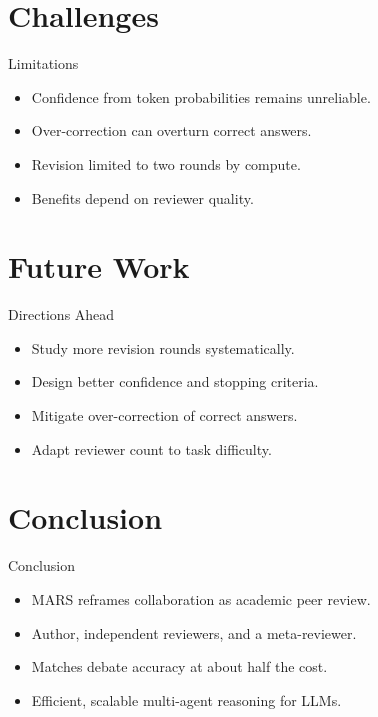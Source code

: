 \documentclass{beamer}
\begin{document}
\section{Challenges}
\begin{frame}{Limitations}
\begin{itemize}
\item Confidence from token probabilities remains unreliable.
\item Over-correction can overturn correct answers.
\item Revision limited to two rounds by compute.
\item Benefits depend on reviewer quality.
\end{itemize}
\end{frame}

\section{Future Work}
\begin{frame}{Directions Ahead}
\begin{itemize}
\item Study more revision rounds systematically.
\item Design better confidence and stopping criteria.
\item Mitigate over-correction of correct answers.
\item Adapt reviewer count to task difficulty.
\end{itemize}
\end{frame}

\section{Conclusion}
\begin{frame}{Conclusion}
\begin{itemize}
\item MARS reframes collaboration as academic peer review.
\item Author, independent reviewers, and a meta-reviewer.
\item Matches debate accuracy at about half the cost.
\item Efficient, scalable multi-agent reasoning for LLMs.
\end{itemize}
\end{frame}
\end{document}
